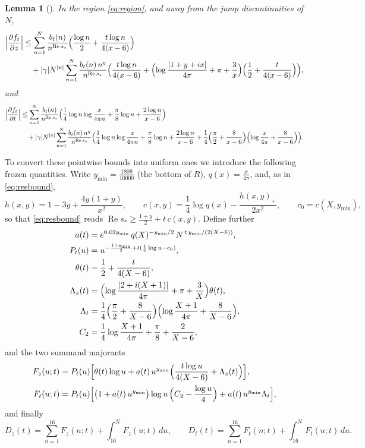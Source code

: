 \documentclass[11pt]{article}
\newtheorem{lemma}[theorem]{Lemma}
\theoremstyle{definition}
\DeclareMathOperator{\Rea}{Re}
\begin{document}
\begin{lemma}[{\cite[Lemma~8.4]{Polymath}}]\label{lem:polyderiv}
In the region \eqref{eq:region}, and away from the jump
discontinuities of $N$,
\begin{align*}
\Bigl|\frac{\partial f_t}{\partial z}\Bigr|
&\le\sum_{n=1}^{N}\frac{b_t(n)}{n^{\Rea s_*}}
\Bigl(\frac{\log n}2+\frac{t\log n}{4(x-6)}\Bigr)\\
&\quad+|\gamma|N^{|\kappa|}\sum_{n=1}^{N}
\frac{b_t(n)\,n^y}{n^{\Rea s_*}}
\Bigl(\frac{t\log n}{4(x-6)}
+\Bigl(\log\frac{|1+y+ix|}{4\pi}+\pi+\frac3x\Bigr)
\Bigl(\frac12+\frac t{4(x-6)}\Bigr)\Bigr),
\end{align*}
and
\begin{align*}
\Bigl|\frac{\partial f_t}{\partial t}\Bigr|
&\le\sum_{n=1}^{N}\frac{b_t(n)}{n^{\Rea s_*}}
\Bigl(\frac14\log n\log\frac x{4\pi n}+\frac\pi8\log n
+\frac{2\log n}{x-6}\Bigr)\\
&\quad+|\gamma|N^{|\kappa|}\sum_{n=1}^{N}
\frac{b_t(n)\,n^y}{n^{\Rea s_*}}
\Bigl(\frac14\log n\log\frac x{4\pi n}+\frac\pi8\log n
+\frac{2\log n}{x-6}
+\frac14\Bigl(\frac\pi2+\frac8{x-6}\Bigr)
\Bigl(\log\frac x{4\pi}+\frac8{x-6}\Bigr)\Bigr).
\end{align*}
\end{lemma}

To convert these pointwise bounds into uniform ones we introduce the
following frozen quantities. Write $y_{\min}=\frac{1809}{10000}$
(the bottom of $R$), $q(x)=\frac x{4\pi}$, and, as in
\eqref{eq:resbound},
\[
h(x,y)=1-3y+\frac{4y(1+y)}{x^2},
\qquad
c(x,y)=\frac14\log q(x)-\frac{h(x,y)_+}{2x^2},
\qquad
c_0=c(X,y_{\min}),
\]
so that \eqref{eq:resbound} reads
$\Rea s_*\ge\frac{1+y}2+t\,c(x,y)$. Define further
\begin{align*}
a(t) &= e^{0.02y_{\min}}\,q(X)^{-y_{\min}/2}\,
N^{\,t\,y_{\min}/(2(X-6))},
\\
P_t(u) &= u^{-\frac{1+y_{\min}}2+t(\frac14\log u-c_0)},
\\
\theta(t) &= \frac12+\frac t{4(X-6)},
\\
\Lambda_z(t) &= \Bigl(\log\frac{|2+i(X+1)|}{4\pi}+\pi+\frac3X\Bigr)
\theta(t),
\\
\Lambda_t &= \frac14\Bigl(\frac\pi2+\frac8{X-6}\Bigr)
\Bigl(\log\frac{X+1}{4\pi}+\frac8{X-6}\Bigr),
\\
C_2 &= \frac14\log\frac{X+1}{4\pi}+\frac\pi8+\frac2{X-6},
\end{align*}
and the two summand majorants
\begin{align*}
F_z(u;t)&=P_t(u)\Bigl[\theta(t)\log u
+a(t)\,u^{y_{\min}}\Bigl(\frac{t\log u}{4(X-6)}
+\Lambda_z(t)\Bigr)\Bigr],\\
F_t(u;t)&=P_t(u)\Bigl[\bigl(1+a(t)\,u^{y_{\min}}\bigr)
\log u\,\Bigl(C_2-\frac{\log u}4\Bigr)
+a(t)\,u^{y_{\min}}\Lambda_t\Bigr],
\end{align*}
and finally
\[
D_z(t)=\sum_{n=1}^{16}F_z(n;t)+\int_{16}^{N}F_z(u;t)\,du,
\qquad
D_t(t)=\sum_{n=1}^{16}F_t(n;t)+\int_{16}^{N}F_t(u;t)\,du .
\]
\end{document}
